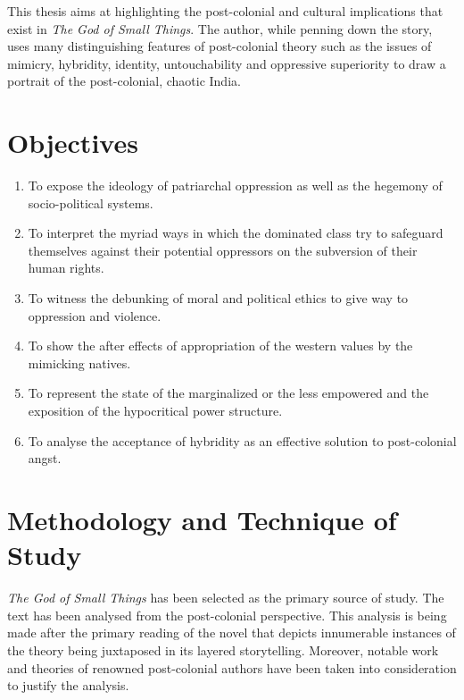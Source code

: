 This  thesis  aims  at  highlighting  the  post-colonial  and  cultural  implications  that  exist  in  \emph{The  God  of  Small  Things}.  The  author,  while  penning  down  the  story,  uses  many  distinguishing  features  of  post-colonial  theory  such  as  the  issues  of  mimicry,  hybridity,  identity,  untouchability  and  oppressive  superiority  to  draw  a  portrait  of  the  post-colonial,  chaotic  India.

\section{Objectives}

\begin{enumerate}
    \item To  expose  the  ideology  of  patriarchal  oppression  as  well as  the  hegemony  of  socio-political  systems.
    \item To  interpret  the  myriad  ways  in  which  the  dominated  class  try  to  safeguard  themselves  against  their  potential  oppressors  on  the  subversion  of  their  human  rights.
    \item To  witness  the  debunking  of  moral  and  political  ethics  to  give  way  to  oppression  and  violence.
    \item To  show  the  after  effects  of  appropriation  of  the  western  values  by  the  mimicking  natives.
    \item To  represent  the  state  of  the  marginalized  or  the  less  empowered  and  the  exposition  of  the  hypocritical  power  structure.
    \item To  analyse  the  acceptance  of  hybridity  as  an  effective  solution  to  post-colonial  angst.
\end{enumerate}


\section{Methodology and Technique of Study}

\emph{The  God  of  Small  Things}  has  been  selected  as  the  primary  source  of  study.  The  text  has  been  analysed  from  the  post-colonial  perspective.  This  analysis  is  being  made  after  the  primary  reading  of  the  novel  that  depicts  innumerable  instances  of  the  theory  being  juxtaposed  in  its  layered  storytelling.  Moreover,  notable  work  and  theories  of  renowned  post-colonial  authors  have  been  taken  into  consideration  to  justify  the  analysis.

